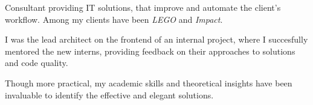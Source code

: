 
Consultant providing IT solutions, that improve and automate the client's
workflow. Among my clients have been \emph{LEGO} and \emph{Impact}.

\medskip

I was the lead architect on the frontend of an internal project, where I
succesfully mentored the new interns, providing feedback on their approaches to
solutions and code quality.

\medskip

Though more practical, my academic skills and theoretical insights have been
invaluable to identify the effective and elegant solutions.

